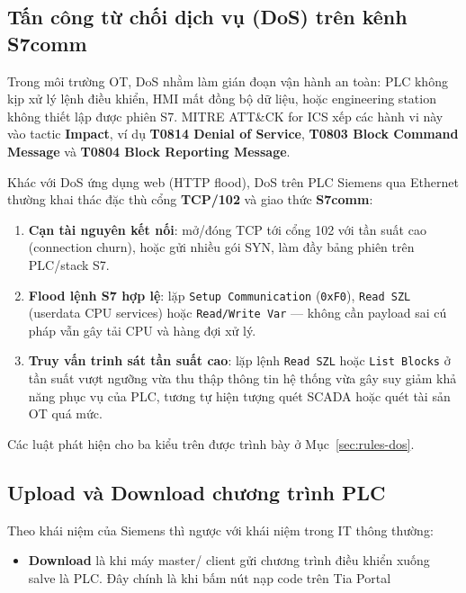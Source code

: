 \documentclass[../main.tex]{subfiles}
\begin{document}
\subsection{Tấn công từ chối dịch vụ (DoS) trên kênh S7comm}
\label{sec:dos_s7comm}

Trong môi trường OT, DoS nhằm làm gián đoạn vận hành an toàn: PLC không kịp xử lý lệnh điều khiển, HMI mất đồng bộ dữ liệu, hoặc engineering station không thiết lập được phiên S7. MITRE ATT\&CK for ICS xếp các hành vi này vào tactic \textbf{Impact}, ví dụ \textbf{T0814 Denial of Service}, \textbf{T0803 Block Command Message} và \textbf{T0804 Block Reporting Message}.

Khác với DoS ứng dụng web (HTTP flood), DoS trên PLC Siemens qua Ethernet thường khai thác đặc thù cổng \textbf{TCP/102} và giao thức \textbf{S7comm}:

\begin{enumerate}
    \item \textbf{Cạn tài nguyên kết nối}: mở/đóng TCP tới cổng 102 với tần suất cao (connection churn), hoặc gửi nhiều gói SYN, làm đầy bảng phiên trên PLC/stack S7.
    \item \textbf{Flood lệnh S7 hợp lệ}: lặp \texttt{Setup Communication} (\texttt{0xF0}), \texttt{Read SZL} (userdata CPU services) hoặc \texttt{Read/Write Var} --- không cần payload sai cú pháp vẫn gây tải CPU và hàng đợi xử lý.
    \item \textbf{Truy vấn trinh sát tần suất cao}: lặp lệnh \texttt{Read SZL} hoặc \texttt{List Blocks} ở tần suất vượt ngưỡng vừa thu thập thông tin hệ thống vừa gây suy giảm khả năng phục vụ của PLC, tương tự hiện tượng quét SCADA hoặc quét tài sản OT quá mức.
\end{enumerate}

Các luật phát hiện cho ba kiểu trên được trình bày ở Mục~\ref{sec:rules-dos}.

\subsection{Upload và Download chương trình PLC}
\label{sec:down_up_program}

Theo khái niệm của Siemens thì ngược với khái niệm trong IT thông thường:


\begin{itemize}
    \item \textbf{Download} là khi máy master/ client gửi chương trình điều khiển xuống salve là PLC. Đây chính là khi bấm nút nạp code trên Tia Portal
\end{itemize}
\end{document}

